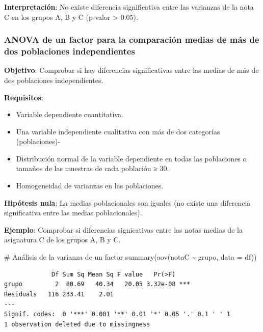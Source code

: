 \documentclass[
  spanish,
  a4paper,
]{scrreport}
\newenvironment{Shaded}{\begin{snugshade}}{\end{snugshade}}
\newcommand{\AttributeTok}[1]{\textcolor[rgb]{0.40,0.45,0.13}{#1}}
\newcommand{\CommentTok}[1]{\textcolor[rgb]{0.37,0.37,0.37}{#1}}
\newcommand{\FunctionTok}[1]{\textcolor[rgb]{0.28,0.35,0.67}{#1}}
\newcommand{\NormalTok}[1]{\textcolor[rgb]{0.00,0.23,0.31}{#1}}
\newcommand{\SpecialCharTok}[1]{\textcolor[rgb]{0.37,0.37,0.37}{#1}}
\providecommand{\tightlist}{%
  \setlength{\itemsep}{0pt}\setlength{\parskip}{0pt}}
\theoremstyle{definition}
\theoremstyle{definition}
\theoremstyle{remark}
\begin{document}
\textbf{Interpretación}: No existe diferencia significativa entre las
varianzas de la nota C en los grupos A, B y C (p-valor \textgreater{}
0.05).

\subsubsection{ANOVA de un factor para la comparación medias de más de
dos poblaciones
independientes}\label{anova-de-un-factor-para-la-comparaciuxf3n-medias-de-muxe1s-de-dos-poblaciones-independientes}

\textbf{Objetivo}: Comprobar si hay diferencias significativas entre las
medias de más de dos poblaciones independientes.

\textbf{Requisitos}:

\begin{itemize}
\tightlist
\item
  Variable dependiente cuantitativa.
\item
  Una variable independiente cualitativa con más de dos categorías
  (poblaciones)-
\item
  Distribución normal de la variable dependiente en todas las
  poblaciones o tamaños de las muestras de cada población ≥ 30.
\item
  Homogeneidad de varianzas en las poblaciones.
\end{itemize}

\textbf{Hipótesis nula}: La medias poblacionales son iguales (no existe
una diferencia significativa entre las medias poblacionales).

\textbf{Ejemplo}: Comprobar si diferencias signicativas entre las notas
medias de la asignatura C de los grupos A, B y C.

\begin{Shaded}
\begin{Highlighting}[]
\CommentTok{\# Análisis de la varianza de un factor}
\FunctionTok{summary}\NormalTok{(}\FunctionTok{aov}\NormalTok{(notaC }\SpecialCharTok{\textasciitilde{}}\NormalTok{ grupo, }\AttributeTok{data =}\NormalTok{ df))}
\end{Highlighting}
\end{Shaded}

\begin{verbatim}
             Df Sum Sq Mean Sq F value   Pr(>F)    
grupo         2  80.69   40.34   20.05 3.32e-08 ***
Residuals   116 233.41    2.01                     
---
Signif. codes:  0 '***' 0.001 '**' 0.01 '*' 0.05 '.' 0.1 ' ' 1
1 observation deleted due to missingness
\end{verbatim}
\end{document}
